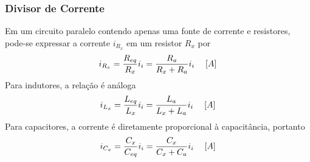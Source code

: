 \documentclass{article}
\numberwithin{equation}{section}
\begin{document}
    \subsubsection{Divisor de Corrente}
    \label{subsubsec:divcor}
    Em um circuito paralelo contendo apenas uma fonte de corrente e resistores, pode-se expressar a corrente $i_{R_x}$ em um resistor $R_{x}$ por
    \begin{equation}
        i_{R_x}=\frac{R_{eq}}{R_{x}}i_{i}=\frac{R_{a}}{R_{x}+R_{a}}i_{i} \hspace{0.45cm}[A]
    \end{equation}
    Para indutores, a relação é análoga
    \begin{equation}
        i_{L_x}=\frac{L_{eq}}{L_{x}}i_{i}=\frac{L_{a}}{L_{x}+L_{a}}i_{i} \hspace{0.45cm}[A]
    \end{equation}
    Para capacitores, a corrente é diretamente proporcional à capacitância, portanto
    \begin{equation}
        i_{C_x}=\frac{C_{x}}{C_{eq}}i_{i}=\frac{C_{x}}{C_{x}+C_{a}}i_{i} \hspace{0.45cm}[A]
    \end{equation}
\end{document}
